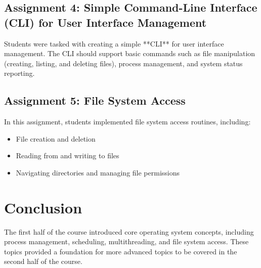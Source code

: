 \documentclass[12pt]{article}
\begin{document}
\subsection{Assignment 4: Simple Command-Line Interface (CLI) for User Interface Management}
Students were tasked with creating a simple **CLI** for user interface management. The CLI should support basic commands such as file manipulation (creating, listing, and deleting files), process management, and system status reporting.

\subsection{Assignment 5: File System Access}
In this assignment, students implemented file system access routines, including:
\begin{itemize}
    \item File creation and deletion
    \item Reading from and writing to files
    \item Navigating directories and managing file permissions
\end{itemize}

\section{Conclusion}
The first half of the course introduced core operating system concepts, including process management, scheduling, multithreading, and file system access. These topics provided a foundation for more advanced topics to be covered in the second half of the course.
\end{document}
